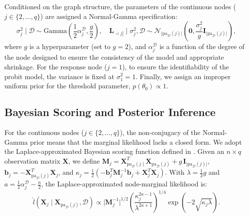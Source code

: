 \documentclass[twoside]{article}
\begin{document}
Conditioned on the graph structure, the parameters of the continuous nodes ($j \in \{2, \dots, q\}$) are assigned a Normal-Gamma specification:
\begin{equation*}
	\sigma_j^2 \mid \mathcal{D} \sim \text{Gamma}\left( \frac{1}{2} \alpha_{j}^{\mathcal{D}}, \frac{g}{2} \right), \quad \boldsymbol{L}_{\prec j \rbrack} \mid \sigma_j^2, \mathcal{D} \sim \mathcal{N}_{\lvert \text{pa}_{\mathcal{D}}(j)\rvert}\left(\boldsymbol{0}, \frac{\sigma_{j}^{2}}{g} \boldsymbol{I}_{\lvert \text{pa}_{\mathcal{D}}(j)\rvert}\right),
\end{equation*}
where $g$ is a hyperparameter (set to $g=2$), and $\alpha_{j}^{\mathcal{D}}$ is a function of the degree of the node designed to ensure the consistency of the model and appropriate shrinkage. For the response node ($j=1$), to ensure the identifiability of the probit model, the variance is fixed at $\sigma_1^2 = 1$.
Finally, we assign an improper uniform prior for the threshold parameter, $p(\theta_0) \propto 1$.

\vspace{-0.3cm}\subsection{Bayesian Scoring and Posterior Inference}
For the continuous nodes ($j \in \{2, \ldots, q\}$), the non-conjugacy of the Normal-Gamma prior means that the marginal likelihood lacks a closed form. We adopt the Laplace-approximated Bayesian scoring function defined in \cite{Nazari:2026}. Given an $n \times q$ observation matrix $\boldsymbol{X}$, we define $\boldsymbol{M}_j = \boldsymbol{X}_{\text{pa}_{\mathcal{D}}(j)}^{T}\boldsymbol{X}_{\text{pa}_{\mathcal{D}}(j)} + g\,\boldsymbol{I}_{\lvert \text{pa}_{\mathcal{D}}(j)\rvert}$, $\boldsymbol{b}_j = -\boldsymbol{X}_{\text{pa}_{\mathcal{D}}(j)}^{T}\boldsymbol{X}_j$, and $\kappa_j = \frac{1}{2}( -\boldsymbol{b}_j^{T}\boldsymbol{M}_j^{-1}\boldsymbol{b}_j + \boldsymbol{X}_j^{T}\boldsymbol{X}_j )$. With $\lambda = \frac{1}{2}g$ and $a = \frac{1}{2}\alpha_j^{\mathcal{D}} - \frac{n}{2}$, the Laplace-approximated node-marginal likelihood is:
\begin{equation*}
	\hat{l}(\boldsymbol{X}_j \mid \boldsymbol{X}_{\text{pa}_{\mathcal{D}}(j)}, \mathcal{D}) \propto \lvert\boldsymbol{M}_j^{-1}\rvert^{1/2} \left(\dfrac{\kappa_j^{2a-1}}{\lambda^{2a+1}}\right)^{1/4}\exp\left(-2\sqrt{\kappa_j \lambda}\right).
\end{equation*}
\end{document}
